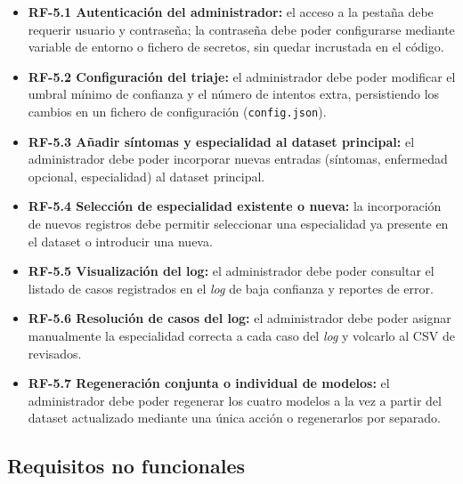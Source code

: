 \begin{itemize}
	\begin{itemize}
		\item \textbf{RF-5.1 Autenticación del administrador:} el acceso a la pestaña debe requerir usuario y contraseña; la contraseña debe poder configurarse mediante variable de entorno o fichero de secretos, sin quedar incrustada en el código.
		\item \textbf{RF-5.2 Configuración del triaje:} el administrador debe poder modificar el umbral mínimo de confianza y el número de intentos extra, persistiendo los cambios en un fichero de configuración (\texttt{config.json}).
		\item \textbf{RF-5.3 Añadir síntomas y especialidad al dataset principal:} el administrador debe poder incorporar nuevas entradas (síntomas, enfermedad opcional, especialidad) al dataset principal.
		\item \textbf{RF-5.4 Selección de especialidad existente o nueva:} la incorporación de nuevos registros debe permitir seleccionar una especialidad ya presente en el dataset o introducir una nueva.
		\item \textbf{RF-5.5 Visualización del log:} el administrador debe poder consultar el listado de casos registrados en el \textit{log} de baja confianza y reportes de error.
		\item \textbf{RF-5.6 Resolución de casos del log:} el administrador debe poder asignar manualmente la especialidad correcta a cada caso del \textit{log} y volcarlo al CSV de revisados.
		\item \textbf{RF-5.7 Regeneración conjunta o individual de modelos:} el administrador debe poder regenerar los cuatro modelos a la vez a partir del dataset actualizado mediante una única acción o regenerarlos por separado.
	\end{itemize}
\end{itemize}

\subsection*{Requisitos no funcionales}

